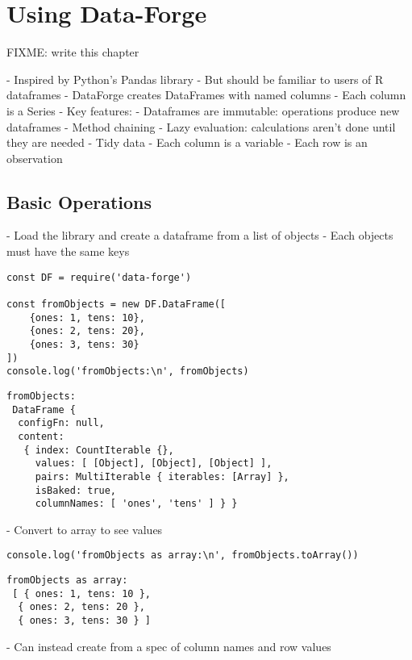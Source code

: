 \chapter{Using Data-Forge}\label{s:dataforge}

FIXME: write this chapter

-   Inspired by Python's Pandas library
    -   But should be familiar to users of R dataframes
-   DataForge creates DataFrames with named columns
-   Each column is a Series
-   Key features:
    -   Dataframes are immutable: operations produce new dataframes
    -   Method chaining
    -   Lazy evaluation: calculations aren't done until they are needed
-   Tidy data
    -   Each column is a variable
    -   Each row is an observation
    
\section{Basic Operations}\label{s:dataforge-basics}

-   Load the library and create a dataframe from a list of objects
    -   Each objects must have the same keys

\begin{verbatim}
const DF = require('data-forge')

const fromObjects = new DF.DataFrame([
    {ones: 1, tens: 10},
    {ones: 2, tens: 20},
    {ones: 3, tens: 30}
])
console.log('fromObjects:\n', fromObjects)
\end{verbatim}

\begin{verbatim}
fromObjects:
 DataFrame {
  configFn: null,
  content:
   { index: CountIterable {},
     values: [ [Object], [Object], [Object] ],
     pairs: MultiIterable { iterables: [Array] },
     isBaked: true,
     columnNames: [ 'ones', 'tens' ] } }
\end{verbatim}

-   Convert to array to see values

\begin{verbatim}
console.log('fromObjects as array:\n', fromObjects.toArray())
\end{verbatim}

\begin{verbatim}
fromObjects as array:
 [ { ones: 1, tens: 10 },
  { ones: 2, tens: 20 },
  { ones: 3, tens: 30 } ]
\end{verbatim}

-   Can instead create from a spec of column names and row values

